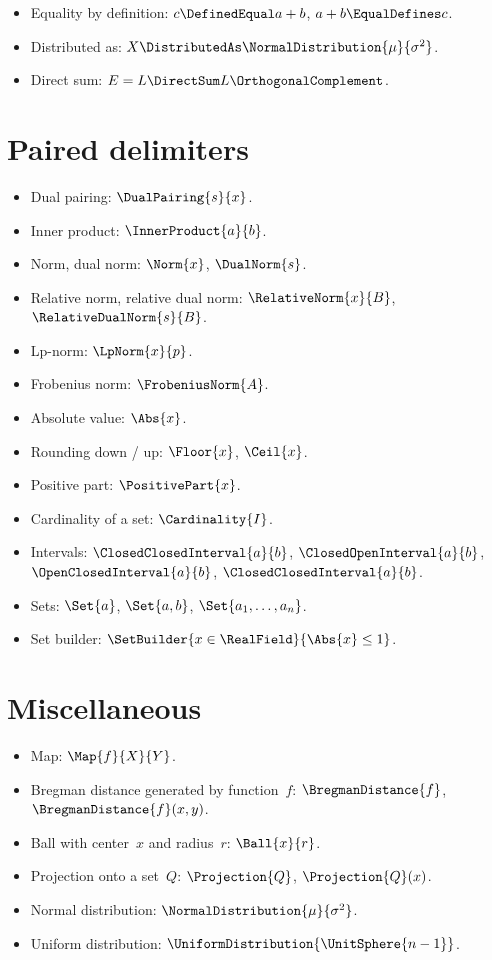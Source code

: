 \documentclass{article}
\begin{document}
  \begin{itemize}
    \item Equality by definition: $c \DefinedEqual a + b$, $a + b \EqualDefines c$.
    \item Distributed as: $X \DistributedAs \NormalDistribution{\mu}{\sigma^2}$.
    \item Direct sum: $E = L \DirectSum L\OrthogonalComplement$.
  \end{itemize}

  \section{Paired delimiters}

  \begin{itemize}
    \item Dual pairing: $\DualPairing{s}{x}$.
    \item Inner product: $\InnerProduct{a}{b}$.
    \item Norm, dual norm: $\Norm{x}$, $\DualNorm{s}$.
    \item Relative norm, relative dual norm: $\RelativeNorm{x}{B}$, $\RelativeDualNorm{s}{B}$.
    \item Lp-norm: $\LpNorm{x}{p}$.
    \item Frobenius norm: $\FrobeniusNorm{A}$.
    \item Absolute value: $\Abs{x}$.
    \item Rounding down / up: $\Floor{x}$, $\Ceil{x}$.
    \item Positive part: $\PositivePart{x}$.
    \item Cardinality of a set: $\Cardinality{I}$.
    \item Intervals: $\ClosedClosedInterval{a}{b}$, $\ClosedOpenInterval{a}{b}$, $\OpenClosedInterval{a}{b}$,
    $\ClosedClosedInterval{a}{b}$.
    \item Sets: $\Set{a}$, $\Set{a, b}$, $\Set{a_1, \dots, a_n}$.
    \item Set builder: $\SetBuilder{x \in \RealField}{\Abs{x} \leq 1}$.
  \end{itemize}

  \section{Miscellaneous}

  \begin{itemize}
    \item Map: $\Map{f}{X}{Y}$.
    \item Bregman distance generated by function~$f$: $\BregmanDistance{f}$, $\BregmanDistance{f}(x, y)$.
    \item Ball with center~$x$ and radius~$r$: $\Ball{x}{r}$.
    \item Projection onto a set~$Q$: $\Projection{Q}$, $\Projection{Q}(x)$.
    \item Normal distribution: $\NormalDistribution{\mu}{\sigma^2}$.
    \item Uniform distribution: $\UniformDistribution{\UnitSphere{n - 1}}$.
  \end{itemize}
\end{document}
